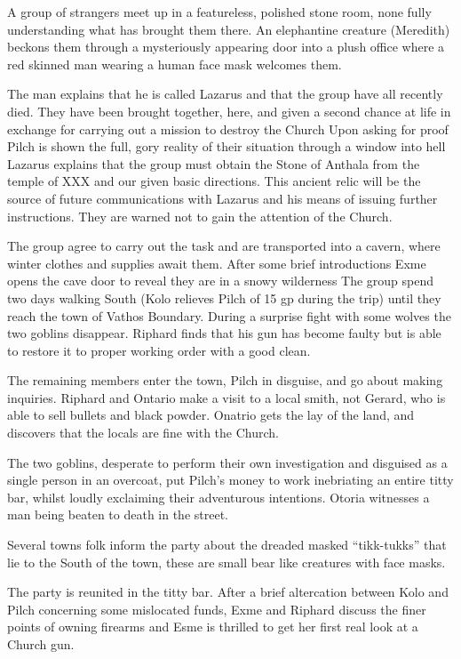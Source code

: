 A group of strangers meet up in a featureless, polished stone room, none fully understanding what has brought them there. An elephantine creature (Meredith) beckons them through a mysteriously appearing door into a plush office where a red skinned man wearing a human face mask welcomes them.

The man explains that he is called Lazarus and that the group have all recently died. They have been brought together, here, and given a second chance at life in exchange for carrying out a mission to destroy the Church Upon asking for proof Pilch is shown the full, gory reality of their situation through a window into hell Lazarus explains that the group must obtain the Stone of Anthala from the temple of XXX and our given basic directions. This ancient relic will be the source of future communications with Lazarus and his means of issuing further instructions. They are warned not to gain the attention of the Church.

The group agree to carry out the task and are transported into a cavern, where winter clothes and supplies await them. After some brief introductions Exme opens the cave door to reveal they are in a snowy wilderness The group spend two days walking South (Kolo relieves Pilch of 15 gp during the trip) until they reach the town of Vathos Boundary. During a surprise fight with some wolves the two goblins disappear. Riphard finds that his gun has become faulty but is able to restore it to proper working order with a good clean.

The remaining members enter the town, Pilch in disguise, and go about making inquiries. Riphard and Ontario make a visit to a local smith, not Gerard, who is able to sell bullets and black powder. Onatrio gets the lay of the land, and discovers that the locals are fine with the Church.

The two goblins, desperate to perform their own investigation and disguised as a single person in an overcoat, put Pilch’s money to work inebriating an entire titty bar, whilst loudly exclaiming their adventurous intentions. Otoria witnesses a man being beaten to death in the street.

Several towns folk inform the party about the dreaded masked “tikk-tukks” that lie to the South of the town, these are small bear like creatures with face masks.

The party is reunited in the titty bar. After a brief altercation between Kolo and Pilch concerning some mislocated funds, Exme and Riphard discuss the finer points of owning firearms and Esme is thrilled to get her first real look at a Church gun.

